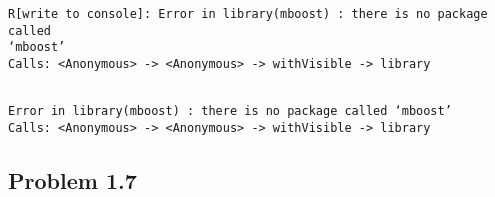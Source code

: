 \documentclass[11pt]{article}
\begin{document}
    \begin{Verbatim}[commandchars=\\\{\}]
R[write to console]: Error in library(mboost) : there is no package called
‘mboost’
Calls: <Anonymous> -> <Anonymous> -> withVisible -> library

    \end{Verbatim}

    \begin{Verbatim}[commandchars=\\\{\}]

Error in library(mboost) : there is no package called ‘mboost’
Calls: <Anonymous> -> <Anonymous> -> withVisible -> library
    \end{Verbatim}

    \hypertarget{problem-1.7}{%
\subsection{Problem 1.7}\label{problem-1.7}}
\end{document}
